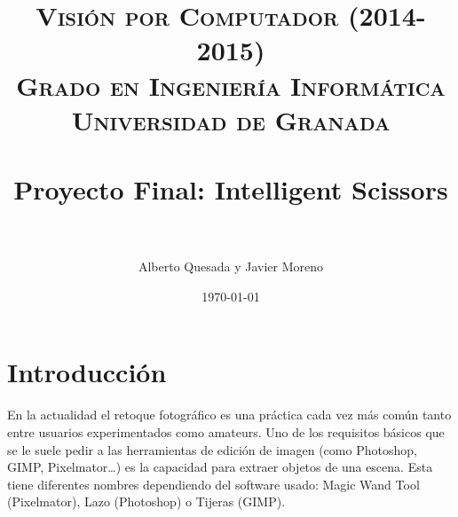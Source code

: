 
\usepackage{listings}




\title{	
\normalfont \normalsize 
\textsc{{\bf Visi\'on por Computador (2014-2015)} \\ Grado en Ingeniería Informática \\ Universidad de Granada} \\ [25pt] %
\horrule{0.5pt} \\[0.4cm] %
\huge Proyecto Final: Intelligent Scissors \\ %
\horrule{2pt} \\[0.5cm] %
}

\author{Alberto Quesada y Javier Moreno} %

\date{\normalsize\today} %




\maketitle %

\newpage %

\tableofcontents %

\listoffigures


\newpage

 
 

\newpage


\section{Introducción}

En la actualidad el retoque fotográfico es una práctica cada vez más común tanto entre usuarios experimentados como amateurs. Uno de los requisitos básicos que se le suele pedir a las herramientas de edición de imagen (como Photoshop, GIMP, Pixelmator…) es la capacidad para extraer objetos de una escena. Esta tiene diferentes nombres dependiendo del software usado: Magic Wand Tool (Pixelmator), Lazo (Photoshop) o Tijeras (GIMP). \\

